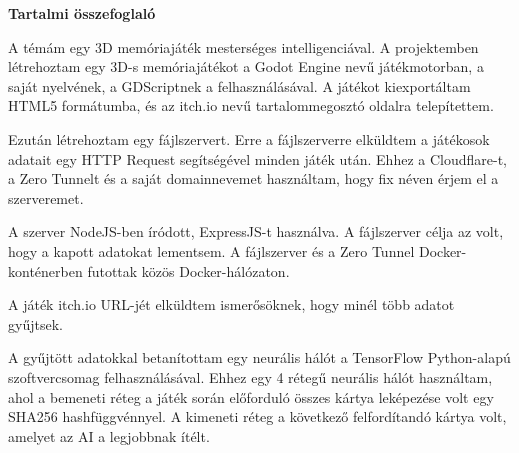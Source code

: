 \textbf{\large{Tartalmi összefoglaló}}\\[32pt]

\thispagestyle{fancy}
\pagestyle{fancy}



\vspace{8pt}


A témám egy 3D memóriajáték mesterséges intelligenciával. A projektemben létrehoztam egy 3D-s memóriajátékot a Godot Engine nevű játékmotorban, a saját nyelvének, a GDScriptnek a felhasználásával. A játékot kiexportáltam HTML5 formátumba, és az itch.io nevű tartalommegosztó oldalra telepítettem.

Ezután létrehoztam egy fájlszervert. Erre a fájlszerverre elküldtem a játékosok adatait egy HTTP Request segítségével minden játék után. Ehhez a Cloudflare-t, a Zero Tunnelt és a saját domainnevemet használtam, hogy fix néven érjem el a szerveremet.

A szerver NodeJS-ben íródott, ExpressJS-t használva. A fájlszerver célja az volt, hogy a kapott adatokat lementsem. A fájlszerver és a Zero Tunnel Docker-konténerben futottak közös Docker-hálózaton.

A játék itch.io URL-jét elküldtem ismerősöknek, hogy minél több adatot gyűjtsek.

A gyűjtött adatokkal betanítottam egy neurális hálót a TensorFlow Python-alapú szoftvercsomag felhasználásával. Ehhez egy 4 rétegű neurális hálót használtam, ahol a bemeneti réteg a játék során előforduló összes kártya leképezése volt egy SHA256 hashfüggvénnyel. A kimeneti réteg a következő felfordítandó kártya volt, amelyet az AI a legjobbnak ítélt.

